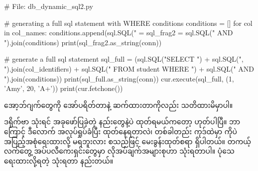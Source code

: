 %
\begin{py}
# File: db_dynamic_sql2.py

# generating a full sql statement with  WHERE conditions
conditions = []
for col in col_names:
    conditions.append(sql.SQL("{} = %
sql_frag2 = sql.SQL(" AND ").join(conditions)
print(sql_frag2.as_string(conn))

# generate a full sql statement
sql_full = (sql.SQL("SELECT ")
            + sql.SQL(", ").join(col_identifiers)
            + sql.SQL(" FROM student WHERE ")
            + sql.SQL(" AND ").join(conditions))
print(sql_full.as_string(conn))
cur.execute(sql_full, (1, 'Amy', 20, 'A+'))
print(cur.fetchone())
\end{py}
%
 အော့ဘ်ဂျက်တွေကို \fCode{+} အော်ပရိတ်တာနဲ့  ဆက်ထားတာကိုလည်း သတိထားမိမှာပါ။

 ဒရိုက်ဗာ သုံးရင် အခုဖော်ပြခဲ့တဲ့ နည်းတွေနဲ့ပဲ  ထုတ်ရမယ်ကတော့ ဟုတ်ပါပြီ။ ဘာကြောင့် ဒီလောက် အလုပ်ရှုပ်ခံပြီး  ထုတ်နေရတာလဲ၊ တစ်ခါတည်း ကုဒ်ထဲမှာ  ကိုပဲ အပြည့်အစုံရေးထားလို့ မရဘူးလား စသည်ဖြင့် မေးခွန်းထုတ်စရာ ရှိပါတယ်။ တကယ့်လက်တွေ့ အပ်ပလီကေးရှင်းတွေမှာ လိုအပ်ချက်အများစုဟာ  သုံးရတာပါ။ ပုံသေရေးထားလို့ရတဲ့  သုံးရတာ နည်းတယ်။ 

